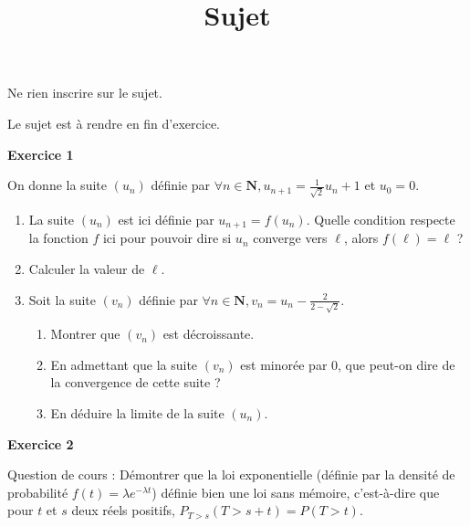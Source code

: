 \documentclass[12pt,a4paper,french]{article}
\author{}
\title{Sujet \no{8}}
\date{}
\begin{document}
\maketitle
\begin{center}Ne rien inscrire sur le sujet.

  Le sujet est à rendre en fin d'exercice.
\end{center}

\bigskip

\textbf{Exercice 1}

On donne la suite $(u_n)$ définie par $\forall n\in \mathbf{N},
u_{n+1} = \frac{1}{\sqrt{2}}u_{n} + 1$ et $u_0 = 0$.
\begin{enumerate}
  \item La suite $(u_n)$ est ici définie par $u_{n+1} = f(u_n)$. Quelle
    condition respecte la fonction $f$ ici pour pouvoir dire si $u_n$
    converge vers $\ell$, alors $f(\ell) = \ell$ ?
  \item Calculer la valeur de $\ell$.
  \item Soit la suite $(v_n)$ définie par $\forall n\in \mathbf{N}, v_n
    = u_n - \frac{2}{2 - \sqrt{2}}$.
    \begin{enumerate}
      \item Montrer que $(v_n)$ est décroissante.
      \item En admettant que la suite $(v_n)$ est minorée par 0, que
        peut-on dire de la convergence de cette suite ?
      \item En déduire la limite de la suite $(u_n)$.
    \end{enumerate}
\end{enumerate}

\medskip

\textbf{Exercice 2}

Question de cours : Démontrer que la loi exponentielle (définie par la
densité de probabilité $f(t) = \lambda e^{-\lambda t}$) définie bien une
loi sans mémoire, c'est-à-dire que pour $t$ et $s$ deux réels positifs,
$P_{T>s}(T > s+t) = P(T > t)$.
\end{document}
